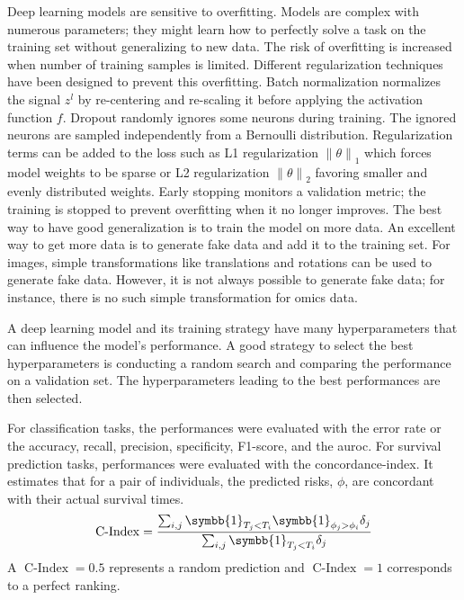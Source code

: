 \documentclass[../main.tex]{subfiles}
\begin{document}
		Deep learning models are sensitive to overfitting.
		Models are complex with numerous parameters; they might learn how to perfectly solve a task on the training set without generalizing to new data.
		The risk of overfitting is increased when number of training samples is limited.
		Different regularization techniques have been designed to prevent this overfitting.
		Batch normalization normalizes the signal \(z^{l}\) by re-centering and re-scaling it before applying the activation function \(f\).
		Dropout randomly ignores some neurons during training.
		The ignored neurons are sampled independently from a Bernoulli distribution.
		Regularization terms can be added to the loss such as L1 regularization \({\|\theta\|}_{1}\) which forces model weights to be sparse or L2 regularization \({\|\theta\|}_{2}\) favoring smaller and evenly distributed weights.
		Early stopping monitors a validation metric; the training is stopped to prevent overfitting when it no longer improves.
		The best way to have good generalization is to train the model on more data.
		An excellent way to get more data is to generate fake data and add it to the training set.
		For images, simple transformations like translations and rotations can be used to generate fake data.
		However, it is not always possible to generate fake data; for instance, there is no such simple transformation for omics data.

		A deep learning model and its training strategy have many hyperparameters that can influence the model's performance.
		A good strategy to select the best hyperparameters is conducting a random search and comparing the performance on a validation set.
		The hyperparameters leading to the best performances are then selected.

		For classification tasks, the performances were evaluated with the error rate or the accuracy, recall, precision, specificity, F1-score, and the \gls{auroc}.
		For survival prediction tasks, performances were evaluated with the concordance-index.
		It estimates that for a pair of individuals, the predicted risks, \(\phi\),  are concordant with their actual survival times.
		\begin{equation}
			\operatorname{C-Index} = \frac{\sum_{i,j}\symbb{1}_{T_j < T_i}\symbb{1}_{\phi_j > \phi_i}\delta_j}{\sum_{i,j}\symbb{1}_{T_j < T_i}\delta_j}
		\end{equation}
		A \(\operatorname{C-Index} = 0.5\) represents a random prediction and \(\operatorname{C-Index} = 1\) corresponds to a perfect ranking.
\end{document}
